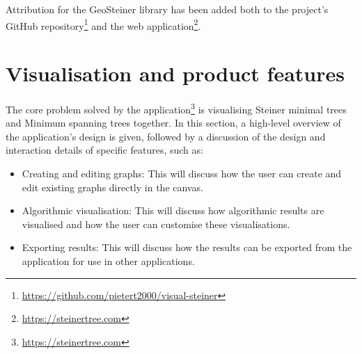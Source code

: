 \documentclass{l4proj}
\begin{document}
Attribution for the GeoSteiner library has been added both to the project's GitHub repository\footnote{\url{https://github.com/pietert2000/visual-steiner}} and the web application\footnote{\url{https://steinertree.com}}.


\chapter{Visualisation and product features}
\label{sec:visualisation_and_product_features}
The core problem solved by the application\footnote{\url{https://steinertree.com}} is visualising Steiner minimal trees and Minimum spanning trees together.
In this section, a high-level overview of the application's design is given, followed by a discussion of the design and interaction details of specific features, such as:
\begin{itemize}
    \item Creating and editing graphs: This will discuss how the user can create and edit existing graphs directly in the canvas.
    \item Algorithmic visualisation: This will discuss how algorithmic results are visualised and how the user can customise these visualisations.
    \item Exporting results: This will discuss how the results can be exported from the application for use in other applications.
\end{itemize}
\end{document}
